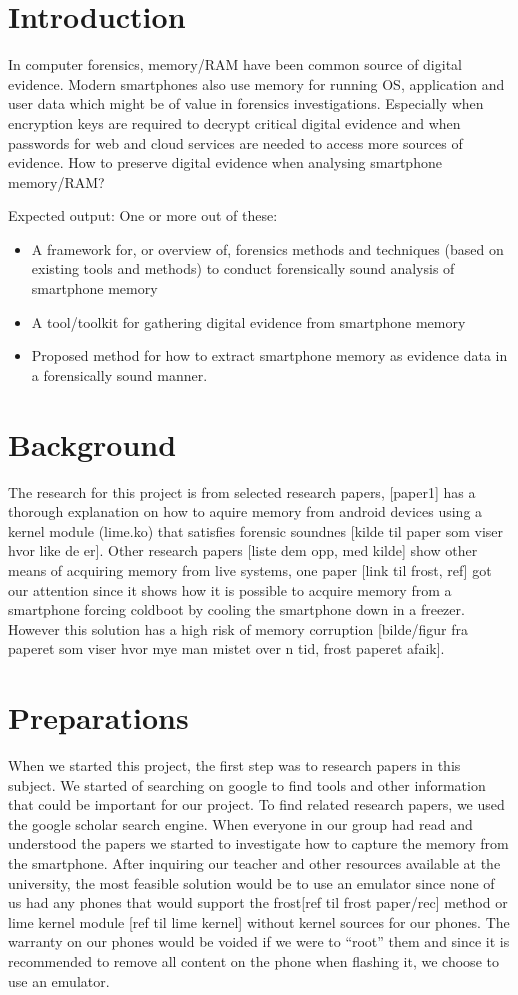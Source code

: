 \section{Introduction}
In computer forensics, memory/RAM have been common source of digital evidence. 
Modern smartphones also use memory for running OS, application and user data 
which might be of value in forensics investigations. Especially when encryption 
keys are required to decrypt critical digital evidence and when passwords for 
web and cloud services are needed to access more sources of evidence. How to 
preserve digital evidence when analysing smartphone memory/RAM?

Expected output:
One or more out of these:
\begin{itemize}
	\item A framework for, or overview of, forensics methods and techniques (based on existing tools and methods) to conduct forensically sound analysis of smartphone memory
	\item A tool/toolkit for gathering digital evidence from smartphone memory
	\item Proposed method for how to extract smartphone memory as evidence data in a forensically sound manner.
\end{itemize}

\section{Background}
The research for this project is from selected research papers, [paper1] has a thorough explanation on how to aquire memory from android devices using a kernel module (lime.ko) that satisfies forensic soundnes [kilde til paper som viser hvor like de er]. Other research papers [liste dem opp, med kilde] show other means of acquiring memory from live systems, one paper [link til frost, ref] got our attention since it shows how it is possible to acquire memory from a smartphone forcing coldboot by cooling the smartphone down in a freezer. However this solution has a high risk of memory corruption [bilde/figur fra paperet som viser hvor mye man mistet over n tid, frost paperet afaik]. 

\section{Preparations}
When we started this project, the first step was to research papers in this subject. We started of searching on google to find tools and other information that could be important for our project. To find related research papers, we used the google scholar search engine. When everyone in our group had read and understood the papers we started to investigate how to capture the memory from the smartphone. After inquiring our teacher and other resources available at the university, the most feasible solution would be to use an emulator since none of us had any phones that would support the frost[ref til frost paper/rec] method or lime kernel module [ref til lime kernel] without kernel sources for our phones. The warranty on our phones would be voided if we were to “root” them and since it is recommended to remove all content on the phone when flashing it, we choose to use an emulator.

